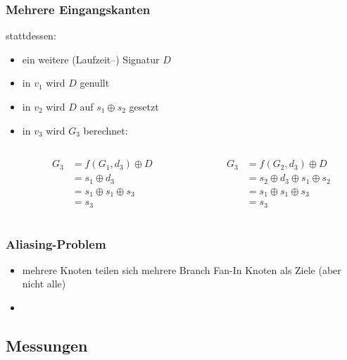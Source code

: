 \documentclass[mathserif,slidestop,compress,red]{beamer}
\begin{document}
\begin{frame}
  \frametitle{Mehrere Eingangskanten}
  stattdessen:
  \begin{itemize}
    \item ein weitere (Laufzeit–) Signatur $D$
    \pause
    \item in $v_1$ wird $D$ genullt
    \pause
    \item in $v_2$ wird $D$ auf $s_1 \oplus s_2$ gesetzt
    \pause
    \item in $v_3$ wird $G_3$ berechnet:
    \begin{columns}
      \begin{column}{0.5\textwidth}
      \begin{align*}
      G_3 &= f(G_1, d_3) \oplus D \\
      &= s_1 \oplus d_3 \\
      &= s_1 \oplus s_1 \oplus s_3 \\
      &= s_3
      \end{align*}
      \end{column}

      \begin{column}{0.5\textwidth}
      \begin{align*}
      G_3 &= f(G_2, d_3) \oplus D \\
      &= s_2 \oplus d_3 \oplus s_1 \oplus s_2 \\
      &= s_1 \oplus s_1 \oplus s_3 \\
      &= s_3
      \end{align*}
      \end{column}
    \end{columns}
  \end{itemize}
\end{frame}

\begin{frame}
  \frametitle{Aliasing-Problem}
  \begin{itemize}
    \item mehrere Knoten teilen sich mehrere Branch Fan-In Knoten als Ziele (aber nicht alle)

    \item
  \end{itemize}
\end{frame}

\subsection{Messungen}
\end{document}
